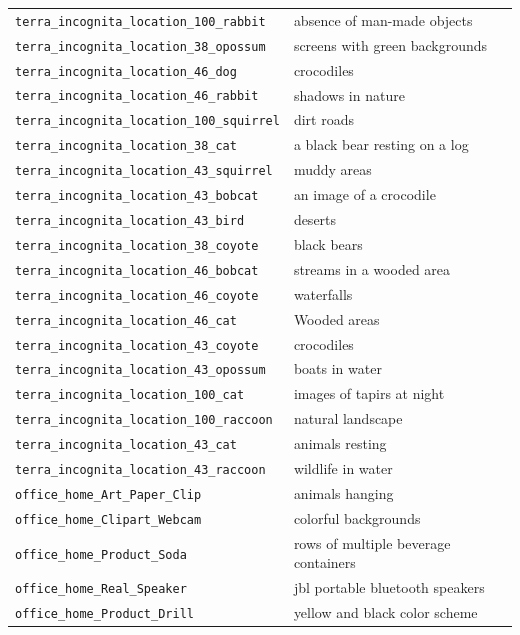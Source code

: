 \documentclass{article} %
\begin{document}
\begin{longtable}{p{} p{}}
\texttt{terra\_incognita\_location\_100\_rabbit} & absence of man-made objects \\
\texttt{terra\_incognita\_location\_38\_opossum} & screens with green backgrounds \\
\texttt{terra\_incognita\_location\_46\_dog} & crocodiles \\
\texttt{terra\_incognita\_location\_46\_rabbit} & shadows in nature \\
\texttt{terra\_incognita\_location\_100\_squirrel} & dirt roads \\
\texttt{terra\_incognita\_location\_38\_cat} & a black bear resting on a log \\
\texttt{terra\_incognita\_location\_43\_squirrel} & muddy areas \\
\texttt{terra\_incognita\_location\_43\_bobcat} & an image of a crocodile \\
\texttt{terra\_incognita\_location\_43\_bird} & deserts \\
\texttt{terra\_incognita\_location\_38\_coyote} & black bears \\
\texttt{terra\_incognita\_location\_46\_bobcat} & streams in a wooded area \\
\texttt{terra\_incognita\_location\_46\_coyote} & waterfalls \\
\texttt{terra\_incognita\_location\_46\_cat} & Wooded areas \\
\texttt{terra\_incognita\_location\_43\_coyote} & crocodiles \\
\texttt{terra\_incognita\_location\_43\_opossum} & boats in water \\
\texttt{terra\_incognita\_location\_100\_cat} & images of tapirs at night \\
\texttt{terra\_incognita\_location\_100\_raccoon} & natural landscape \\
\texttt{terra\_incognita\_location\_43\_cat} & animals resting \\
\texttt{terra\_incognita\_location\_43\_raccoon} & wildlife in water \\
\midrule
\texttt{office\_home\_Art\_Paper\_Clip} & animals hanging \\
\texttt{office\_home\_Clipart\_Webcam} & colorful backgrounds \\
\texttt{office\_home\_Product\_Soda} & rows of multiple beverage containers \\
\texttt{office\_home\_Real\_Speaker} & jbl portable bluetooth speakers \\
\texttt{office\_home\_Product\_Drill} & yellow and black color scheme \\

\end{longtable}
\end{document}
